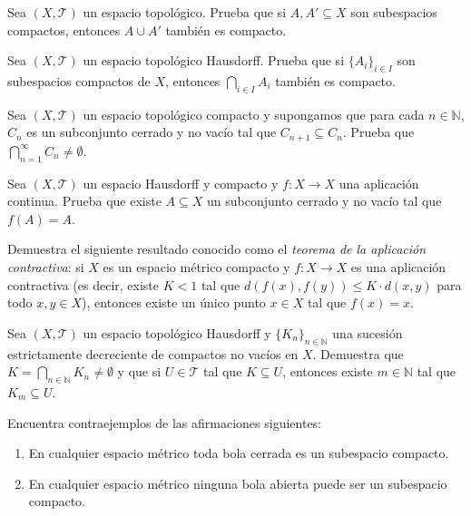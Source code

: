 \begin{ejercicio}
Sea \((X, \mathcal{T})\) un espacio topológico. Prueba que si \( A, A' \subseteq X \) son subespacios compactos, entonces \( A \cup A' \) también es compacto.
\end{ejercicio}


\begin{ejercicio}
Sea \((X, \mathcal{T})\) un espacio topológico Hausdorff. Prueba que si \(\{A_i\}_{i \in I}\) son subespacios compactos de \(X\), entonces \(\bigcap\limits_{i \in I} A_i\) también es compacto.
\end{ejercicio}

\begin{ejercicio}
Sea \((X, \mathcal{T})\) un espacio topológico compacto y supongamos que para cada \(n \in \mathbb{N}\), \(C_n\) es un subconjunto cerrado y no vacío tal que \(C_{n+1} \subseteq C_n\). Prueba que \(\bigcap\limits_{n=1}^{\infty} C_n \neq \emptyset\).
\end{ejercicio}

\begin{ejercicio}
Sea \((X, \mathcal{T})\) un espacio Hausdorff y compacto y \(f: X \to X\) una aplicación continua. Prueba que existe \(A \subseteq X\) un subconjunto cerrado y no vacío tal que \(f(A) = A\).
\end{ejercicio}

\begin{ejercicio}
Demuestra el siguiente resultado conocido como el \emph{teorema de la aplicación contractiva}: si \(X\) es un espacio métrico compacto y \(f: X \to X\) es una aplicación contractiva (es decir, existe \(K < 1\) tal que \(d(f(x), f(y)) \leq K \cdot d(x, y)\) para todo \(x, y \in X\)), entonces existe un único punto \(x \in X\) tal que \(f(x) = x\).
\end{ejercicio}

\begin{ejercicio}
Sea \((X, \mathcal{T})\) un espacio topológico Hausdorff y \(\{K_n\}_{n \in \mathbb{N}}\) una sucesión estrictamente decreciente de compactos no vacíos en \(X\). Demuestra que \(K = \bigcap\limits_{n \in \mathbb{N}} K_n \neq \emptyset\) y que si \(U \in \mathcal{T}\) tal que \(K \subseteq U\), entonces existe \(m \in \mathbb{N}\) tal que \(K_m \subseteq U\).
\end{ejercicio}

\begin{ejercicio}
Encuentra contraejemplos de las afirmaciones siguientes:
\begin{enumerate}
\item En cualquier espacio métrico toda bola cerrada es un subespacio compacto.
\item En cualquier espacio métrico ninguna bola abierta puede ser un subespacio compacto.
\end{enumerate}
\end{ejercicio}

